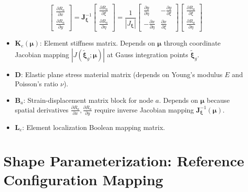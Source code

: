 \documentclass[12pt,a4paper,oneside]{report}
\newcommand{\mat}[1]{\mathbf{#1}}
\begin{document}
\begin{equation}
    \begin{bmatrix} \frac{\partial R_a}{\partial x} \\[0.3em] \frac{\partial R_a}{\partial y} \end{bmatrix} = \mat{J}_{\boldsymbol{\xi}}^{-1} \begin{bmatrix} \frac{\partial R_a}{\partial \xi} \\[0.3em] \frac{\partial R_a}{\partial \eta} \end{bmatrix} = \frac{1}{|J_{\boldsymbol{\xi}}|} \begin{bmatrix} \frac{\partial y}{\partial \eta} & -\frac{\partial y}{\partial \xi} \\[0.3em] -\frac{\partial x}{\partial \eta} & \frac{\partial x}{\partial \xi} \end{bmatrix} \begin{bmatrix} \frac{\partial R_a}{\partial \xi} \\[0.3em] \frac{\partial R_a}{\partial \eta} \end{bmatrix}
\end{equation}
\begin{tcolorbox}[colback=gray!5!white,colframe=gray!60!black,title={Term Definitions \& Parameter Dependencies}]
\begin{itemize}
    \item $\mat{K}_e(\boldsymbol{\mu})$: Element stiffness matrix. Depends on $\boldsymbol{\mu}$ through coordinate Jacobian mapping $|J(\tilde{\boldsymbol{\xi}}_g; \boldsymbol{\mu})|$ at Gauss integration points $\tilde{\boldsymbol{\xi}}_g$.
    \item $\mat{D}$: Elastic plane stress material matrix (depends on Young's modulus $E$ and Poisson's ratio $\nu$).
    \item $\mat{B}_a$: Strain-displacement matrix block for node $a$. Depends on $\boldsymbol{\mu}$ because spatial derivatives $\frac{\partial R_a}{\partial x}, \frac{\partial R_a}{\partial y}$ require inverse Jacobian mapping $\mat{J}_{\boldsymbol{\xi}}^{-1}(\boldsymbol{\mu})$.
    \item $\mat{L}_e$: Element localization Boolean mapping matrix.
\end{itemize}
\end{tcolorbox}


\chapter{Shape Parameterization: Reference Configuration Mapping}
\label{ch:pullback}
\end{document}
